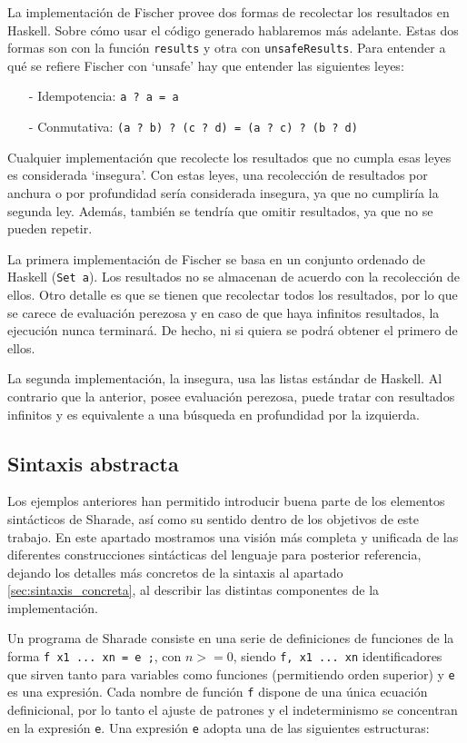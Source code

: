 \documentclass[class=article, crop=false]{standalone}
\begin{document}
La implementación de Fischer provee dos formas de recolectar los resultados en Haskell. Sobre
cómo usar el código generado hablaremos más adelante. Estas dos formas son con la función
\verb`results` y otra con \verb`unsafeResults`. Para entender a qué se refiere Fischer con
`unsafe' hay que entender las siguientes leyes:

\begin{itemize}
	\item[-] Idempotencia: \verb`a ? a = a`
	\item[-] Conmutativa: \verb`(a ? b) ? (c ? d) = (a ? c) ? (b ? d)`
\end{itemize}

Cualquier implementación que recolecte los resultados que no cumpla esas leyes es considerada
`insegura'. Con estas leyes, una recolección de resultados por anchura o por profundidad
sería considerada insegura, ya que no cumpliría la segunda ley. Además, también se tendría
que omitir resultados, ya que no se pueden repetir.

La primera implementación de Fischer se basa en un conjunto ordenado de Haskell 
(\verb`Set a`). Los resultados no se almacenan de acuerdo con la recolección de ellos. Otro
detalle es que se tienen que recolectar todos los resultados, por lo que se carece de
evaluación perezosa y en caso de que haya infinitos resultados, la ejecución nunca terminará.
De hecho, ni si quiera se podrá obtener el primero de ellos.

La segunda implementación, la insegura, usa las listas estándar de Haskell. Al contrario que
la anterior, posee evaluación perezosa, puede tratar con resultados infinitos y es
equivalente a una búsqueda en profundidad por la izquierda.

\subsection{Sintaxis abstracta}\label{sec:sintaxis_abstracta}

Los ejemplos anteriores han permitido introducir buena parte de los elementos sintácticos
de Sharade, así como su sentido dentro de los objetivos de este trabajo. En este apartado
mostramos una visión más completa y unificada de las diferentes construcciones sintácticas
del lenguaje para posterior referencia, dejando los detalles más concretos de la sintaxis al
apartado \ref{sec:sintaxis_concreta}, al describir las distintas componentes de la
implementación.

Un programa de Sharade consiste en una serie de definiciones de funciones de la forma
\verb`f x1 ... xn = e ;`, con $n >= 0$, siendo \verb`f, x1 ... xn` identificadores que sirven
tanto para variables como funciones (permitiendo orden superior) y \verb`e` es una expresión.
Cada nombre de función \verb`f` dispone de una única ecuación definicional, por lo tanto el
ajuste de patrones y el indeterminismo se concentran en la expresión \verb`e`. Una expresión
\verb`e` adopta una de las siguientes estructuras:
\end{document}
